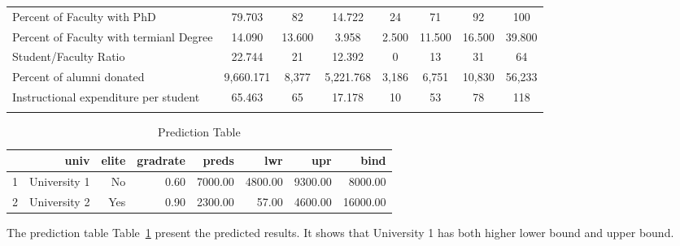 \documentclass{article}\usepackage[]{graphicx}\usepackage[]{color}
\begin{document}
\begin{table}
\begin{tabular}{@{\extracolsep{5pt}}lccccccc}
Percent of Faculty with PhD & 79.703 & 82 & 14.722 & 24 & 71 & 92 & 100 \\ 
Percent of Faculty with termianl Degree & 14.090 & 13.600 & 3.958 & 2.500 & 11.500 & 16.500 & 39.800 \\ 
Student/Faculty Ratio & 22.744 & 21 & 12.392 & 0 & 13 & 31 & 64 \\ 
Percent of alumni donated & 9,660.171 & 8,377 & 5,221.768 & 3,186 & 6,751 & 10,830 & 56,233 \\ 
Instructional expenditure per student & 65.463 & 65 & 17.178 & 10 & 53 & 78 & 118 \\ 
\hline \\[-1.8ex] 
\end{tabular} 
\end{table} 



\begin{table}[ht]
\centering
\begin{tabular}{|l|rrrrrrr|}
  \hline
 & univ & elite & gradrate & preds & lwr & upr & bind \\ 
  \hline
1 & University 1 & No & 0.60 & 7000.00 & 4800.00 & 9300.00 & 8000.00 \\ 
  2 & University 2 & Yes & 0.90 & 2300.00 & 57.00 & 4600.00 & 16000.00 \\ 
   \hline
\end{tabular}
\caption{Prediction Table} 
\label{prediction}
\end{table}


The prediction table Table~\ref{prediction} present the predicted results. It shows that University 1 has both higher lower bound and upper bound.
\end{document}
